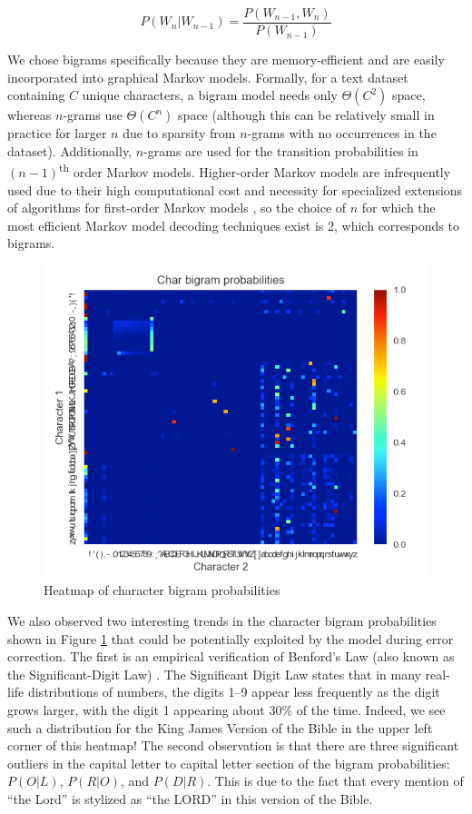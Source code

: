 \documentclass[10pt,twocolumn,letterpaper]{article}
\begin{document}
\begin{equation}
\label{bigram_eq}
P(W_n|W_{n-1}) = \frac{P(W_{n-1}, W_{n})}{P(W_{n-1})}
\end{equation}

We chose bigrams specifically because they are memory-efficient and
are easily incorporated into graphical Markov models. Formally, for
a text dataset containing $C$ unique characters, a bigram model
needs only $\Theta(C^2)$ space, whereas $n$-grams use
$\Theta(C^{n})$ space (although this can
be relatively small in practice for larger $n$ due to sparsity from
$n$-grams with no occurrences in the dataset). Additionally, $n$-grams
are used for the transition probabilities in
$(n-1)$\textsuperscript{th} order Markov models.
Higher-order Markov models are infrequently used due to their high
computational cost and necessity for specialized extensions of algorithms
for first-order Markov models \cite{DuPreez98-ETO}, so the choice of
$n$ for which the most efficient Markov model decoding techniques exist
is 2, which corresponds to bigrams.

\begin{figure}
\includegraphics[scale=.45]{24272959_889664494543135_1476429274_n.png}
\caption{Heatmap of character bigram probabilities}
\label{fig:bigram_heatmap}
\end{figure}

We also observed two interesting trends in the character bigram probabilities shown in Figure \ref{fig:bigram_heatmap}
that could be potentially exploited by the model during error correction.
The first is an empirical verification of Benford's Law (also known as
the Significant-Digit Law) \cite{Hill95-ASD}. The Significant Digit Law states
that in many real-life distributions of numbers, the digits 1--9 appear less
frequently as the digit grows larger, with the digit 1 appearing about
$30\%$ of the time. Indeed, we see such a distribution for the King James
Version of the Bible in the upper left corner of this heatmap! The
second observation is that there are three significant outliers in the
capital letter to capital letter section of the bigram probabilities:
$P(O | L)$, $P(R | O)$, and $P(D | R)$. This is due to the fact that every
mention of ``the Lord'' is stylized as ``the LORD'' in this version of the
Bible.
\end{document}
